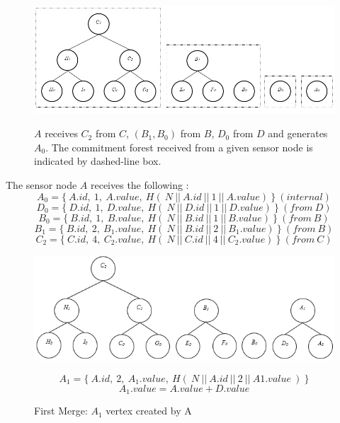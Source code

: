 	\begin{figure}[hp]
		\centering
		\includegraphics[scale = 0.7]{images/commitment-tree-example-1.png}\\
		\caption{$A$ receives $C_{2}$ from $C$, $(B_{1},B_{0})$ from $B$, $D_{0}$ from $D$ and generates $A_{0}$. The commitment forest received from a given sensor node is indicated by dashed-line box.}
		\label{fig:commitment-tree-example-1}
	\end{figure}
	The sensor node $A$ receives the following \payloads:
		\begin{equation}
			A_{0} = \{\ A.id,\ 1,\ A.value,\ H  (\ N\ ||\ A.id\ ||\ 1\ ||\ A.value)\ \}\ (internal)
		\end{equation}
		\begin{equation}
			D_{0} = \{\ D.id,\ 1,\ D.value,\ H(\ N\ ||\ D.id\ ||\ 1\ ||\ D.value)\ \}\ (from\ D)
		\end{equation}
		\begin{equation}
			B_{0} = \{\ B.id,\ 1,\ B.value,\ H(\ N\ ||\ B.id\ ||\ 1\ ||\ B.value)\ \}\ (from\ B)
		\end{equation}
		\begin{equation}
			B_{1} = \{\ B.id,\ 2,\ B_{1}.value,\ H(\ N\ ||\ B.id\ ||\ 2\ ||\ B_{1}.value)\ \}\ (from\ B)
		\end{equation}
		\begin{equation}
			C_{2} = \{\ C.id,\ 4,\ C_{2}.value,\ H(\ N\ ||\ C.id\ ||\ 4\ ||\ C_{2}.value)\ \}\ (from\ C)
		\end{equation}

	\begin{figure}[hp]
		\centering
		\includegraphics[scale = 0.7]{images/commitment-tree-example-2.png}\\
		\caption{First Merge: $A_{1}$ vertex created by A}
		\label{fig:commitment-tree-example-2}
		\begin{equation}
			A_{1} = \{\ A.id,\ 2,\ A_{1}.value,\ H(\ N\ ||\ A.id\ ||\ 2\ ||\ A{1}.value\ )\ \}
		\end{equation}
		\begin{equation}
			A_{1}.value = A.value + D.value
		\end{equation}
	\end{figure}

